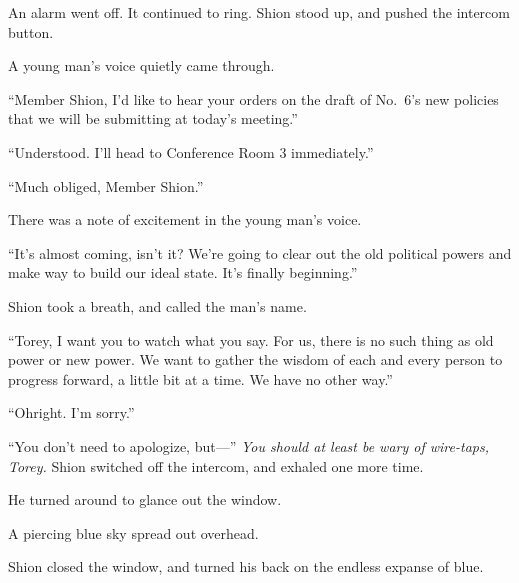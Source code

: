An alarm went off. It continued to ring. Shion stood up, and
pushed the intercom button.

A young man's voice quietly came through.

``Member Shion, I'd like to hear your orders on the draft of No.~6's new
policies that we will be submitting at today's meeting.''

``Understood. I'll head to Conference Room 3 immediately.''

``Much obliged, Member Shion.''

There was a note of excitement in the young man's voice.

``It's almost coming, isn't it? We're going to clear out the old
political powers and make way to build our ideal state. It's finally
beginning.''

Shion took a breath, and called the man's name.

``Torey, I want you to watch what you say. For us, there is no such
thing as old power or new power. We want to gather the wisdom of each
and every person to progress forward, a little bit at a time. We have no
other way.''

``Oh\el right. I'm sorry.''

``You don't need to apologize, but---'' \emph{You should at least be wary of
wire-taps, Torey.} Shion switched off the intercom, and exhaled one more
time.

He turned around to glance out the window.

A piercing blue sky spread out overhead.

Shion closed the window, and turned his back on the endless expanse of
blue.